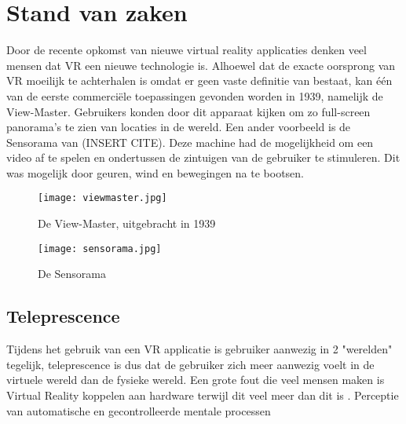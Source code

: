 \chapter{Stand van zaken}
\label{ch:stand-van-zaken}



Door de recente opkomst van nieuwe virtual reality applicaties denken veel mensen dat VR een nieuwe technologie is. Alhoewel dat de exacte oorsprong van VR moeilijk te achterhalen is omdat er geen vaste definitie van bestaat, kan één van de eerste commerciële toepassingen gevonden worden in 1939, namelijk de View-Master. Gebruikers konden door dit apparaat kijken om zo full-screen panorama's te zien van locaties in de wereld. Een ander voorbeeld is de Sensorama van (INSERT CITE). Deze machine had de mogelijkheid om een video af te spelen en ondertussen de zintuigen van de gebruiker te stimuleren. Dit was mogelijk door geuren, wind en bewegingen na te bootsen.
\begin{figure}
    \texttt{[image: viewmaster.jpg]}
    \caption{De View-Master, uitgebracht in 1939}
    \label{fig:viewmaster}
\end{figure}

\begin{figure}
    \texttt{[image: sensorama.jpg]}
    \caption{De Sensorama}
    \label{fig:sensorama}
\end{figure}

\section{Teleprescence}
Tijdens het gebruik van een VR applicatie is gebruiker aanwezig in 2 "werelden" tegelijk, teleprescence is dus dat de gebruiker zich meer aanwezig voelt in de virtuele wereld dan de fysieke wereld.
Een grote fout die veel mensen maken is Virtual Reality koppelen aan hardware terwijl dit veel meer dan dit is \autocite{Steuer1992}.
Perceptie van automatische en gecontrolleerde mentale processen

